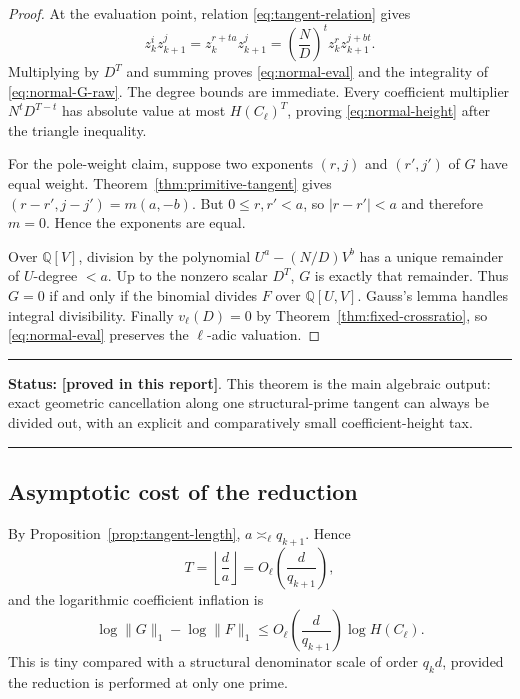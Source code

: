 \documentclass[11pt,oneside]{article}
\theoremstyle{definition}
\theoremstyle{remark}
\newcommand{\Q}{\mathbb Q}
\newcommand{\provedhere}{\textcolor{proofgreen}{\textbf{[proved in this report]}}}
\newenvironment{statusbox}[1]
{\begin{center}\begin{minipage}{0.94\textwidth}\raggedright\hrule\vspace{0.45em}\textbf{Status:} #1\par\vspace{0.35em}}
{\vspace{0.35em}\hrule\end{minipage}\end{center}}
\begin{document}
\begin{proof}
At the evaluation point, relation \eqref{eq:tangent-relation} gives
\[
 z_k^{i}z_{k+1}^{j}
 =z_k^{r+ta}z_{k+1}^j
 =\left(\frac ND\right)^t z_k^r z_{k+1}^{j+bt}.
\]
Multiplying by $D^T$ and summing proves \eqref{eq:normal-eval} and the integrality of
\eqref{eq:normal-G-raw}.  The degree bounds are immediate.  Every coefficient multiplier
$N^tD^{T-t}$ has absolute value at most $H(C_\ell)^T$, proving
\eqref{eq:normal-height} after the triangle inequality.

For the pole-weight claim, suppose two exponents $(r,j)$ and $(r',j')$ of $G$ have equal
weight.  Theorem~\ref{thm:primitive-tangent} gives
$(r-r',j-j')=m(a,-b)$.  But $0\le r,r'<a$, so $|r-r'|<a$ and therefore $m=0$.  Hence the
exponents are equal.

Over $\Q[V]$, division by the polynomial
$U^a-(N/D)V^b$ has a unique remainder of $U$-degree $<a$.  Up to the nonzero scalar $D^T$,
$G$ is exactly that remainder.  Thus $G=0$ if and only if the binomial divides $F$ over
$\Q[U,V]$.  Gauss's lemma handles integral divisibility.  Finally
$v_\ell(D)=0$ by Theorem~\ref{thm:fixed-crossratio}, so \eqref{eq:normal-eval} preserves the
$\ell$-adic valuation.
\end{proof}

\begin{statusbox}{\provedhere.  This theorem is the main algebraic output: exact geometric
cancellation along one structural-prime tangent can always be divided out, with an explicit
and comparatively small coefficient-height tax.}
\end{statusbox}

\subsection{Asymptotic cost of the reduction}

By Proposition~\ref{prop:tangent-length}, $a\asymp_\ell q_{k+1}$.  Hence
\begin{equation}
 T=\left\lfloor\frac d a\right\rfloor
 =O_\ell\!\left(\frac d{q_{k+1}}\right),
 \label{eq:T-cost}
\end{equation}
and the logarithmic coefficient inflation is
\begin{equation}
 \log\lVert G\rVert_1-
 \log\lVert F\rVert_1
 \le O_\ell\!\left(\frac d{q_{k+1}}\right)\log H(C_\ell).
 \label{eq:normal-cost}
\end{equation}
This is tiny compared with a structural denominator scale of order $q_kd$, provided the
reduction is performed at only one prime.
\end{document}
